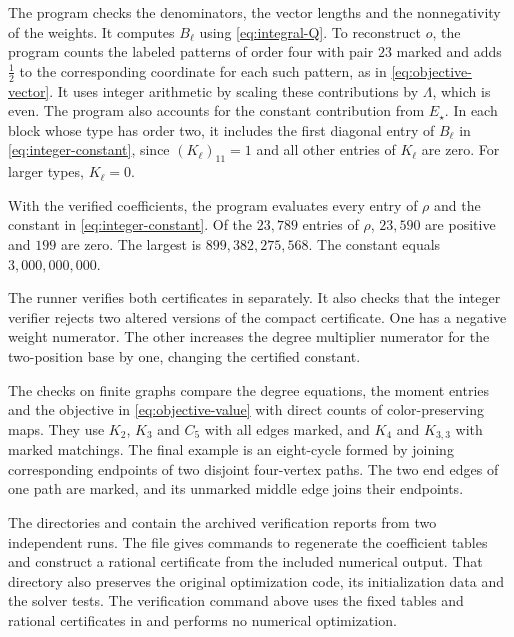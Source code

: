 \documentclass[preprint,11pt,numbers]{elsarticle-arxiv}
\numberwithin{equation}{section}
\theoremstyle{definition}
\begin{document}
The program  checks the denominators,
the vector lengths and the nonnegativity of the weights. It computes
$B_\ell$ using \eqref{eq:integral-Q}. To reconstruct $o$, the program
counts the labeled patterns of order four with pair $23$ marked and
adds $\frac{1}{2}$ to the corresponding coordinate for each such
pattern, as in \eqref{eq:objective-vector}. It uses integer arithmetic
by scaling these contributions by $\Lambda$, which is even. The
program also accounts for the constant contribution from $E_\star$.
In each block whose type has order two, it includes the first
diagonal entry of $B_\ell$ in \eqref{eq:integer-constant}, since
$(K_\ell)_{11}=1$ and all other entries of $K_\ell$ are zero.
For larger types, $K_\ell=0$.

With the verified coefficients, the program evaluates every entry of
$\rho$ and the constant in \eqref{eq:integer-constant}. Of the
$23{,}789$ entries of $\rho$, $23{,}590$ are positive and $199$ are
zero. The largest is $899{,}382{,}275{,}568$. The constant equals
$3{,}000{,}000{,}000$.

The runner verifies both certificates in  separately.
It also checks that the integer verifier rejects two altered versions
of the compact certificate. One has a negative weight numerator.
The other increases the degree multiplier numerator for the
two-position base by one, changing the certified constant.

The checks on finite graphs compare the degree equations, the moment
entries and the objective in \eqref{eq:objective-value} with direct
counts of color-preserving maps. They use $K_2$, $K_3$ and $C_5$ with
all edges marked, and $K_4$ and $K_{3,3}$ with marked matchings.
The final example is an eight-cycle formed by joining corresponding
endpoints of two disjoint four-vertex paths. The two end edges of one
path are marked, and its unmarked middle edge joins their endpoints.

The directories  and
 contain the archived verification reports from two independent runs. The file
 gives commands to regenerate the
coefficient tables and construct a rational certificate from the
included numerical output. That directory also preserves the
original optimization code, its initialization data and the solver
tests. The verification command above uses the fixed tables and
rational certificates in  and performs no numerical
optimization.
\end{document}

